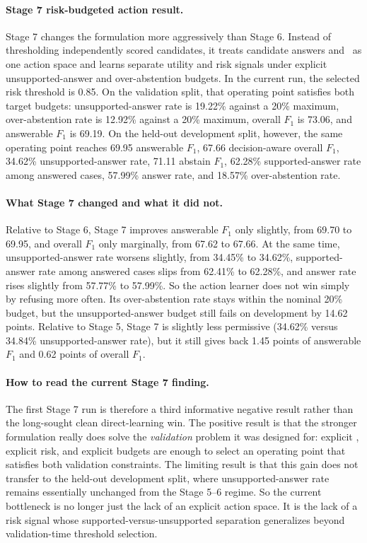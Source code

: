 \paragraph{Stage 7 risk-budgeted action result.}
Stage 7 changes the formulation more aggressively than Stage 6.
Instead of thresholding independently scored candidates, it treats candidate
answers and \abstain\ as one action space and learns separate utility and risk
signals under explicit unsupported-answer and over-abstention budgets.
In the current run, the selected risk threshold is 0.85.
On the validation split, that operating point satisfies both target budgets:
unsupported-answer rate is 19.22\% against a 20\% maximum, over-abstention rate
is 12.92\% against a 20\% maximum, overall $F_1$ is 73.06, and answerable
$F_1$ is 69.19.
On the held-out development split, however, the same operating point reaches
69.95 answerable $F_1$, 67.66 decision-aware overall $F_1$,
34.62\% unsupported-answer rate, 71.11 abstain $F_1$, 62.28\%
supported-answer rate among answered cases, 57.99\% answer rate, and
18.57\% over-abstention rate.

\paragraph{What Stage 7 changed and what it did not.}
Relative to Stage 6, Stage 7 improves answerable $F_1$ only slightly, from
69.70 to 69.95, and overall $F_1$ only marginally, from 67.62 to 67.66.
At the same time, unsupported-answer rate worsens slightly, from 34.45\% to
34.62\%, supported-answer rate among answered cases slips from 62.41\% to
62.28\%, and answer rate rises slightly from 57.77\% to 57.99\%.
So the action learner does not win simply by refusing more often.
Its over-abstention rate stays within the nominal 20\% budget, but the
unsupported-answer budget still fails on development by 14.62 points.
Relative to Stage 5, Stage 7 is slightly less permissive
(34.62\% versus 34.84\% unsupported-answer rate), but it still gives back
1.45 points of answerable $F_1$ and 0.62 points of overall $F_1$.

\paragraph{How to read the current Stage 7 finding.}
The first Stage 7 run is therefore a third informative negative result rather
than the long-sought clean direct-learning win.
The positive result is that the stronger formulation really does solve the
\emph{validation} problem it was designed for:
explicit \abstain, explicit risk, and explicit budgets are enough to select an
operating point that satisfies both validation constraints.
The limiting result is that this gain does not transfer to the held-out
development split, where unsupported-answer rate remains essentially unchanged
from the Stage 5--6 regime.
So the current bottleneck is no longer just the lack of an explicit action
space.
It is the lack of a risk signal whose supported-versus-unsupported separation
generalizes beyond validation-time threshold selection.

